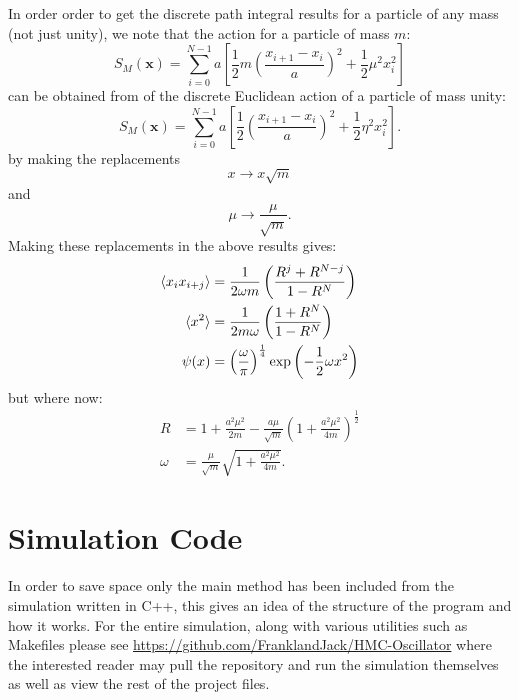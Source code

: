 \documentclass[12pt]{article}
\begin{document}
        In order order to get the discrete path integral results for a particle of any mass (not just unity), we note that the action for a particle of mass $m$:
        \begin{equation}
            \label{eq:ActionMassM}
            S_{M}\left(\bm{x}\right) = \sum_{i=0}^{N-1}a\left[\frac{1}{2}m\left(\frac{x_{i+1}-x_i}{a}\right)^2+\frac{1}{2}\mu^2 x_i^2\right]
        \end{equation}
        can be obtained from of the discrete Euclidean action of a particle of mass unity:
        \begin{equation}
            \label{eq:ActionMassUnity}
            S_{M}\left(\bm{x}\right) = \sum_{i=0}^{N-1}a\left[\frac{1}{2}\left(\frac{x_{i+1}-x_i}{a}\right)^2+\frac{1}{2}\eta^2x_i^2\right].
        \end{equation}
        by making the replacements
        \begin{equation}
            \label{eq:XRescaling}
            x\rightarrow x\sqrt{m}
        \end{equation}
        and
        \begin{equation}
            \label{eq:MuRescaling} 
            \mu \rightarrow \frac{\mu}{\sqrt{m}}. 
        \end{equation}
        Making these replacements in the above results gives:
        \begin{align}
            \braket{x_ix_{i+j}} & = \frac{1}{2\omega m}\left(\frac{R^j+R^{N-j}}{1-R^N}\right) \\
            \braket{x^2} & =\frac{1}{2m\omega}\left(\frac{1+R^N}{1-R^N}\right) \\
            \psi(x) & = \left(\frac{\omega}{\pi}\right)^\frac{1}{4}\exp\left(-\frac{1}{2}\omega x^2\right)
        \end{align}
        but where now:
        \begin{align}
            R & = 1 + \frac{a^2\mu^2}{2m}-\frac{a\mu}{\sqrt{m}}\left(1+\frac{a^2\mu^2}{4m}\right)^\frac{1}{2}\\
            \omega & = \frac{\mu}{\sqrt{m}}\sqrt{1+\frac{a^2\mu^2}{4m}}.
        \end{align}

\section{Simulation Code}
    In order to save space only the main method has been included from the simulation written in C++, this gives an idea of the structure of the program and how it works. For the entire simulation, along with various utilities such as Makefiles please see \url{https://github.com/FranklandJack/HMC-Oscillator} where the interested reader may pull the repository and run the simulation themselves as well as view the rest of the project files.
    
\end{document}
